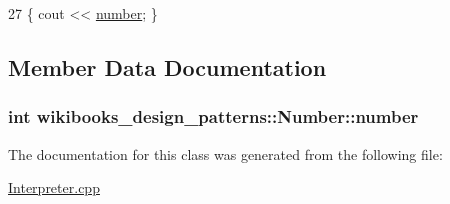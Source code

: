 \begin{DoxyCode}
27 \{ cout << \hyperlink{classwikibooks__design__patterns_1_1Number_aef987597017592f4cdab36541b430778}{number}; \}
\end{DoxyCode}


\subsection{Member Data Documentation}
\subsubsection[{\texorpdfstring{number}{number}}]{\setlength{\rightskip}{0pt plus 5cm}int wikibooks\+\_\+design\+\_\+patterns\+::\+Number\+::number\hspace{0.3cm}{\ttfamily [private]}}\hypertarget{classwikibooks__design__patterns_1_1Number_aef987597017592f4cdab36541b430778}{}\label{classwikibooks__design__patterns_1_1Number_aef987597017592f4cdab36541b430778}


The documentation for this class was generated from the following file\+:\begin{DoxyCompactItemize}
\item 
\hyperlink{Interpreter_8cpp}{Interpreter.\+cpp}\end{DoxyCompactItemize}
